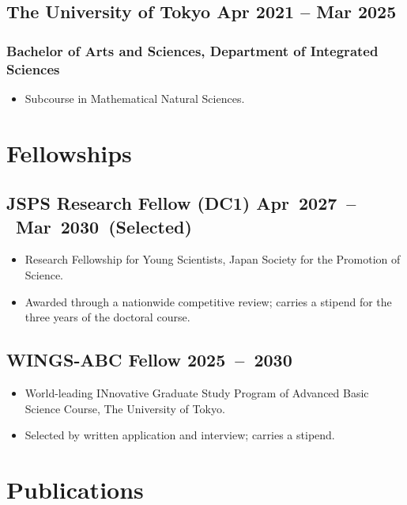 \documentclass[11pt]{article}
\begin{document}
\subsection{The University of Tokyo \hfill Apr 2021 -- Mar 2025}
\subsubsection{Bachelor of Arts and Sciences, Department of Integrated Sciences}
\begin{itemize}
	\item Subcourse in Mathematical Natural Sciences.
\end{itemize}

\section{Fellowships}
\subsection{JSPS Research Fellow (DC1) \hfill \mbox{Apr 2027 -- Mar 2030 (Selected)}}
\begin{itemize}
	\item Research Fellowship for Young Scientists, Japan Society for the Promotion of Science.
	\item Awarded through a nationwide competitive review; carries a stipend for the three years of the doctoral course.
\end{itemize}

\subsection{WINGS-ABC Fellow \hfill \mbox{2025 -- 2030}}
\begin{itemize}
	\item World-leading INnovative Graduate Study Program of Advanced Basic Science Course, The University of Tokyo.
	\item Selected by written application and interview; carries a stipend.
\end{itemize}

\section{Publications}
\begin{enumerate}[series=cvrefs, label={[\arabic*]}]
	\item {}
\end{enumerate}
\end{document}
